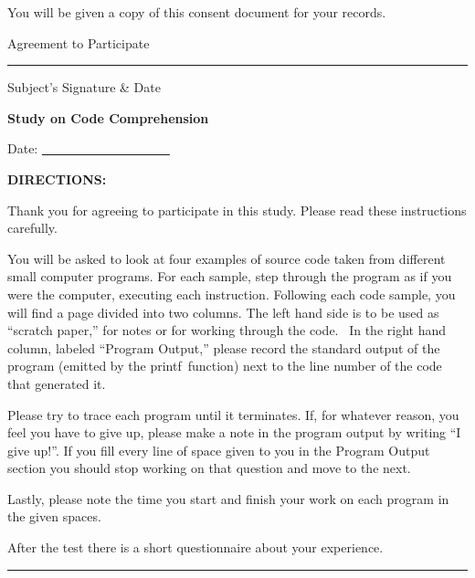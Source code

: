 \documentclass[12pt, a4paper, oneside]{article}
\begin{document}
You will be given a copy of this consent document for your records.

\vspace{20pt}

Agreement to Participate

\vspace{20pt}

\rule{0.7\linewidth}{\linethickness}

Subject's Signature \& Date

\pagebreak

\begin{center}\textbf{Study on Code Comprehension}\end{center}

\vspace{20pt}

Date: \underline{~~~~~~~~~~~~~~~~~~~~}

\vspace{20pt}

\textbf{DIRECTIONS:}

{Thank you for agreeing to participate in this study. Please read these
instructions carefully.}

{You will be asked to look at four examples of source code taken from
different small computer programs. For each sample, }{step through the
program as if you were the computer, executing each instruction.
Following each code sample, you will find a page divided into two
columns. The left hand side is to be used as ``scratch paper,'' for
notes or for working through the code. ~In the right hand column,
labeled ``Program Output,'' please record the standard output of the
program (emitted by the }{printf}{~function) next to the line number of
the code that generated it.}

Please try to trace each program until it terminates. If, for whatever reason, you feel you have to give up, please make a note in the program output by writing “I give up!”. If you fill every line of space given to you in the Program Output section you should stop working on that question and move to the next.

Lastly, please note the time you start and finish your work on each program in the given spaces.

After the test there is a short questionnaire about your experience.

\begin{center}\rule{0.8\linewidth}{2pt}\end{center}
\end{document}
